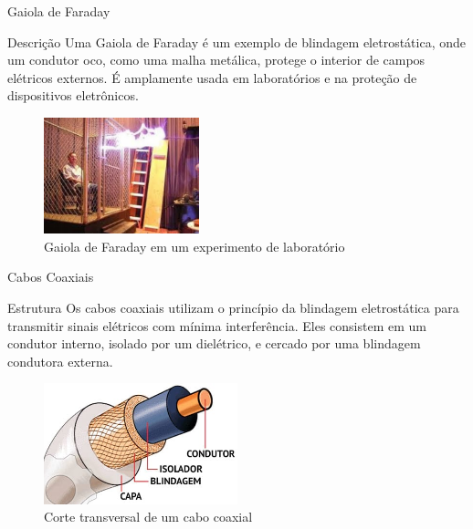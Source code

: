 \documentclass{beamer}
\begin{document}
  \begin{frame}{Gaiola de Faraday}
  \begin{block}{Descrição}
  Uma Gaiola de Faraday é um exemplo de blindagem eletrostática, onde um condutor oco, como uma malha metálica, protege o interior de campos elétricos externos. É amplamente usada em laboratórios e na proteção de dispositivos eletrônicos.
  \end{block}
  
  \begin{figure}
  \centering
  \includegraphics[width=0.4\textwidth]{images/gaiola_faraday_experimento.png}
  \caption{Gaiola de Faraday em um experimento de laboratório}
  \end{figure}
  
  \end{frame}
  
  \begin{frame}{Cabos Coaxiais}
  \begin{block}{Estrutura}
  Os cabos coaxiais utilizam o princípio da blindagem eletrostática para transmitir sinais elétricos com mínima interferência. Eles consistem em um condutor interno, isolado por um dielétrico, e cercado por uma blindagem condutora externa.
  \end{block}
  
  \begin{figure}
  \centering
  \includegraphics[width=0.5\textwidth]{images/cabo_coaxial.png}
  \caption{Corte transversal de um cabo coaxial}
  \end{figure}
  
  \end{frame}
  
\end{document}
